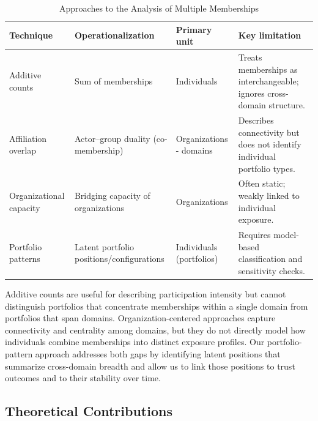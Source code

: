 \begin{table}[!t]
\caption{Approaches to the Analysis of Multiple Memberships}
\label{table:approaches}
\small
\setlength{\tabcolsep}{6pt}
\renewcommand{\arraystretch}{1.15}
\begin{tabularx}{\textwidth}{L{2.6cm}Y L{3.1cm}Y}
\hline
\textbf{Technique} & \textbf{Operationalization} & \textbf{Primary unit} & \textbf{Key limitation} \\
\hline
Additive counts &
Sum of memberships \parencite{putnam_bowling_2000, paxton_association_2007, glanville_voluntary_2004} &
Individuals &
Treats memberships as interchangeable; ignores cross-domain structure. \\

Affiliation overlap &
Actor--group duality (co-membership) \parencite{breiger_duality_1974, mcpherson_hypernetwork_1982} &
Organizations - domains &
Describes connectivity but does not identify individual portfolio types. \\

Organizational capacity &
Bridging capacity of organizations \parencite{paxton_association_2007, diani_cement_2015, knoke_associations_1986, penalopez_capital_2018} &
Organizations &
Often static; weakly linked to individual exposure. \\

Portfolio patterns &
Latent portfolio positions/configurations \parencite{pachucki_cultural_2010, moody_structural_2003} &
Individuals (portfolios) &
Requires model-based classification and sensitivity checks. \\
\hline
\end{tabularx}
\end{table}



Additive counts are useful for describing participation intensity but cannot distinguish portfolios that concentrate memberships within a single domain from portfolios that span domains. Organization-centered approaches capture connectivity and centrality among domains, but they do not directly model how individuals combine memberships into distinct exposure profiles. Our portfolio-pattern approach addresses both gaps by identifying latent positions that summarize cross-domain breadth and allow us to link those positions to trust outcomes and to their stability over time.

\subsection{Theoretical Contributions}

